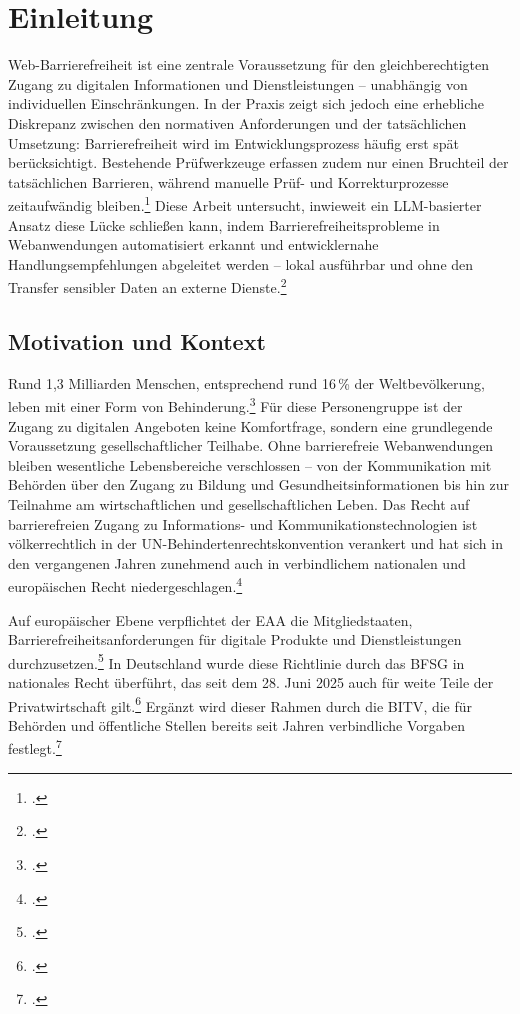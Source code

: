 \chapter{Einleitung} \label{kap:1}

Web-Barrierefreiheit ist eine zentrale Voraussetzung für den gleichberechtigten Zugang zu digitalen Informationen und Dienstleistungen -- unabhängig von individuellen Einschränkungen. In der Praxis zeigt sich jedoch eine erhebliche Diskrepanz zwischen den normativen Anforderungen und der tatsächlichen Umsetzung: Barrierefreiheit wird im Entwicklungsprozess häufig erst spät berücksichtigt. Bestehende Prüfwerkzeuge erfassen zudem nur einen Bruchteil der tatsächlichen Barrieren, während manuelle Prüf- und Korrekturprozesse zeitaufwändig bleiben.\footcites[Vgl.][]{souzaAccessibilityEvaluationWeb2024}[][S. 175]{abuaddousWebAccessibilityChallenges2016} Diese Arbeit untersucht, inwieweit ein \acs{LLM}-basierter Ansatz diese Lücke schließen kann, indem Barrierefreiheitsprobleme in Webanwendungen automatisiert erkannt und entwicklernahe Handlungs\-empfehlungen abgeleitet werden -- lokal ausführbar und ohne den Transfer sensibler Daten an externe Dienste.\footcite[Vgl.][S. 297]{bassi_assessment_2025}

\section{Motivation und Kontext}\label{kap:1.1}

Rund 1,3 Milliarden Menschen, entsprechend rund 16\,\% der Weltbevölkerung, leben mit einer Form von Behinderung.\footcite[Vgl.][]{WHO} Für diese Personengruppe ist der Zugang zu digitalen Angeboten keine Komfortfrage, sondern eine grundlegende Voraussetzung gesellschaftlicher Teilhabe. Ohne barrierefreie Webanwendungen bleiben wesentliche Lebensbereiche verschlossen -- von der Kommunikation mit Behörden über den Zugang zu Bildung und Gesundheitsinformationen bis hin zur Teilnahme am wirtschaftlichen und gesellschaftlichen Leben. Das Recht auf barrierefreien Zugang zu Informations- und Kommunikationstechnologien ist völkerrechtlich in der UN-Behindertenrechtskonvention verankert und hat sich in den vergangenen Jahren zunehmend auch in verbindlichem nationalen und europäischen Recht niedergeschlagen.\footcite[Vgl.][]{OHCHR}

Auf europäischer Ebene verpflichtet der \ac{EAA} die Mitgliedstaaten, Barrierefreiheitsanforderungen für digitale Produkte und Dienstleistungen durchzusetzen.\footcite[Vgl.][]{EAA} In Deutschland wurde diese Richtlinie durch das \ac{BFSG} in nationales Recht überführt, das seit dem 28. Juni 2025 auch für weite Teile der Privatwirtschaft gilt.\footcite[Vgl.][]{BFSG} Ergänzt wird dieser Rahmen durch die \ac{BITV}, die für Behörden und öffentliche Stellen bereits seit Jahren verbindliche Vorgaben festlegt.\footcites[Vgl.][]{BITV}[][S. 281]{heinemann_barrierefreiheit_2024}

